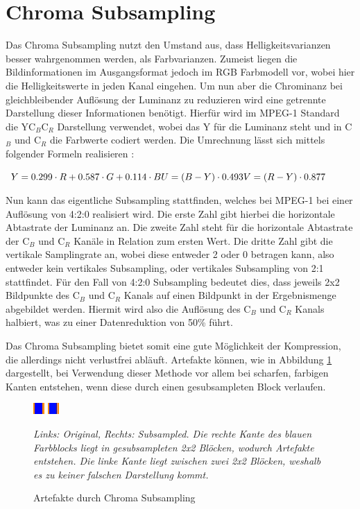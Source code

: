 \section{Chroma Subsampling}

Das Chroma Subsampling nutzt den Umstand aus, dass Helligkeitsvarianzen besser wahrgenommen werden, als Farbvarianzen. Zumeist liegen die Bildinformationen im Ausgangsformat jedoch im RGB Farbmodell vor, wobei hier die Helligkeitswerte in jeden Kanal eingehen. Um nun aber die Chrominanz bei gleichbleibender Auflösung der Luminanz zu reduzieren wird eine getrennte Darstellung dieser Informationen benötigt. Hierfür wird im MPEG-1 Standard die YC$_B$C$_R$ Darstellung verwendet, wobei das Y für die Luminanz steht und in C$_B$ und C$_R$ die Farbwerte codiert werden. Die Umrechnung lässt sich mittels folgender Formeln realisieren \cite{itu-t_recommendation_1995}:

$
Y = 0.299 \cdot R + 0.587 \cdot G + 0.114 \cdot B \\
U = (B - Y) \cdot 0.493 \\
V = (R - Y) \cdot 0.877
$

Nun kann das eigentliche Subsampling stattfinden, welches bei MPEG-1 bei einer Auflösung von 4:2:0 realisiert wird. Die erste Zahl gibt hierbei die horizontale Abtastrate der Luminanz an. Die zweite Zahl steht für die horizontale Abtastrate der C$_B$ und C$_R$ Kanäle in Relation zum ersten Wert. Die dritte Zahl gibt die vertikale Samplingrate an, wobei diese entweder 2 oder 0 betragen kann, also entweder kein vertikales Subsampling, oder vertikales Subsampling von 2:1 stattfindet. Für den Fall von 4:2:0 Subsampling bedeutet dies, dass jeweils 2x2 Bildpunkte des C$_B$ und C$_R$ Kanals auf einen Bildpunkt in der Ergebnismenge abgebildet werden. Hiermit wird also die Auflösung des C$_B$ und C$_R$ Kanals halbiert, was zu einer Datenreduktion von 50\% führt. \cite{poynton_chroma_????} %

Das Chroma Subsampling bietet somit eine gute Möglichkeit der Kompression, die allerdings nicht verlustfrei abläuft. Artefakte können, wie in Abbildung \ref{fig:chroma_artefacts} dargestellt, bei Verwendung dieser Methode vor allem bei scharfen, farbigen Kanten entstehen, wenn diese durch einen gesubsampleten Block verlaufen.

\begin{figure}[h!]
    \centering
    \includegraphics[scale=10]{images/2-1_chroma_artefacts_original.png}
    \includegraphics[scale=10]{images/2-1_chroma_artefacts_sampled.png}
    \caption{Artefakte durch Chroma Subsampling}
    \textit{Links: Original, Rechts: Subsampled. Die rechte Kante des blauen Farbblocks liegt in gesubsampleten 2x2 Blöcken, wodurch Artefakte entstehen. Die linke Kante liegt zwischen zwei 2x2 Blöcken, weshalb es zu keiner falschen Darstellung kommt.}
    \label{fig:chroma_artefacts}
\end{figure}

